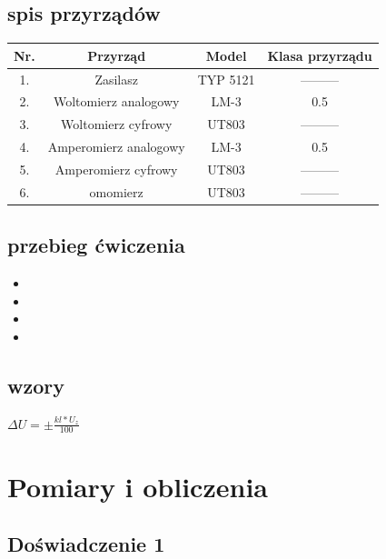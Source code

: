 \documentclass{article}  %
\begin{document}
        \subsection{spis przyrządów}
            \begin{table}[H]
                \centering
                \begin{tabular}{|c|c|c|c|}
                \hline
                Nr.&Przyrząd             &  Model   & Klasa przyrządu    \\ \hline
                1. &Zasilasz             & TYP 5121 &   ---------        \\ \hline
                2. &Woltomierz analogowy &   LM-3   &      0.5           \\ \hline
                3. &Woltomierz cyfrowy   &  UT803   &   ---------        \\ \hline
                4. &Amperomierz analogowy&   LM-3   &      0.5           \\ \hline
                5. &Amperomierz cyfrowy  &  UT803   &   ---------        \\ \hline
                6. &omomierz             &  UT803   &   ---------        \\ \hline
                \end{tabular}
            \end{table}

        \subsection{przebieg ćwiczenia}
            \begin{itemize}
                \item 
                \item 
                \item 
                \item 
            \end{itemize}
        \subsection{wzory}
            $\Delta U = \pm \frac{kl \ast U_z}{100}$

    \section{Pomiary i obliczenia}
        \subsection{Doświadczenie 1}
\end{document}
